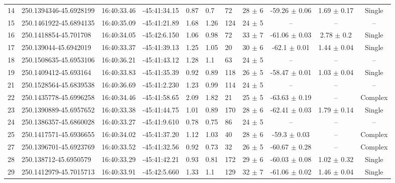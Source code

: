 \documentclass[longauth]{aa} %
\begin{document}
\begin{appendix}
\begin{table}[htbp!]
\begin{tabular}{llllllllccc}
14  &  250.1394346-45.6928199  &  16:40:33.46  &  -45:41:34.15  &  0.87  &  0.7  &  72  &  28 $\pm$ 6  &  -59.26 $\pm$ 0.06  &  1.69 $\pm$ 0.17  &  Single \\
15  &  250.1461922-45.6894135  &  16:40:35.09  &  -45:41:21.89  &  1.68  &  1.26  &  124  &  24 $\pm$ 5  &  --  &  --  &  -- \\
16  &  250.1418854-45.701708  &  16:40:34.05  &  -45:42:6.150  &  1.06  &  0.98  &  72  &  33 $\pm$ 7  &  -61.06 $\pm$ 0.03  &  2.78 $\pm$ 0.2  &  Single \\
17  &  250.139044-45.6942019  &  16:40:33.37  &  -45:41:39.13  &  1.25  &  1.05  &  20  &  30 $\pm$ 6  &  -62.1 $\pm$ 0.01  &  1.44 $\pm$ 0.04  &  Single \\
18  &  250.1508635-45.6953106  &  16:40:36.21  &  -45:41:43.12  &  1.28  &  1.1  &  63  &  24 $\pm$ 5  &  --  &  --  &  -- \\
19  &  250.1409412-45.693164  &  16:40:33.83  &  -45:41:35.39  &  0.92  &  0.89  &  118  &  26 $\pm$ 5  &  -58.47 $\pm$ 0.01  &  1.03 $\pm$ 0.04  &  Single \\
21  &  250.1528564-45.6839538  &  16:40:36.69  &  -45:41:2.230  &  1.23  &  0.99  &  114  &  24 $\pm$ 5  &  --  &  --  &  -- \\
22  &  250.1435778-45.6996258  &  16:40:34.46  &  -45:41:58.65  &  2.09  &  1.82  &  21  &  25 $\pm$ 5  &  -63.63 $\pm$ 0.19  &  --  &  Complex \\
23  &  250.1390889-45.6957652  &  16:40:33.38  &  -45:41:44.75  &  1.01  &  0.89  &  170  &  28 $\pm$ 6  &  -62.41 $\pm$ 0.03  &  1.79 $\pm$ 0.14  &  Single \\
24  &  250.1386357-45.6860028  &  16:40:33.27  &  -45:41:9.610  &  0.78  &  0.75  &  86  &  24 $\pm$ 5  &  --  &  --  &  -- \\
25  &  250.1417571-45.6936655  &  16:40:34.02  &  -45:41:37.20  &  1.12  &  1.03  &  40  &  28 $\pm$ 6  &  -59.3 $\pm$ 0.03  &  --  &  Complex \\
27  &  250.1396701-45.6923769  &  16:40:33.52  &  -45:41:32.56  &  0.92  &  0.73  &  32  &  26 $\pm$ 5  &  -60.67 $\pm$ 0.28  &  --  &  Complex \\
28  &  250.138712-45.6950579  &  16:40:33.29  &  -45:41:42.21  &  0.93  &  0.81  &  172  &  29 $\pm$ 6  &  -60.03 $\pm$ 0.08  &  1.02 $\pm$ 0.32  &  Single \\
29  &  250.1412979-45.7015713  &  16:40:33.91  &  -45:42:5.660  &  1.33  &  1.1  &  129  &  32 $\pm$ 7  &  -61.06 $\pm$ 0.02  &  1.46 $\pm$ 0.04  &  Single \\

\end{tabular}
\end{table}
\end{appendix}
\end{document}
